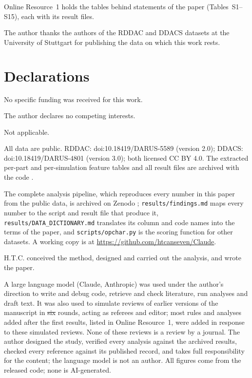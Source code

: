 \documentclass[pdflatex,sn-basic,lineno]{sn-jnl}
\providecommand{\DIFadd}[1]{{\protect\color{blue}\uwave{#1}}} %
\providecommand{\DIFdel}[1]{{\protect\color{red}\sout{#1}}}                      %
\providecommand{\DIFaddbegin}{} %
\providecommand{\DIFaddend}{} %
\providecommand{\DIFdelbegin}{} %
\providecommand{\DIFdelend}{} %
\newcommand{\DIFscaledelfig}{0.5}
\newlength{\DIFdelgraphicswidth} %
\newlength{\DIFdelgraphicsheight} %
\newcommand{\DIFaddincludegraphics}[2][]{{\color{blue}\fbox{\DIFOincludegraphics[#1]{#2}}}} %
\newcommand{\DIFdelincludegraphics}[2][]{%
\sbox{\DIFdelgraphicsbox}{\DIFOincludegraphics[#1]{#2}}%
\settoboxwidth{\DIFdelgraphicswidth}{\DIFdelgraphicsbox} %
\settoboxtotalheight{\DIFdelgraphicsheight}{\DIFdelgraphicsbox} %
\scalebox{\DIFscaledelfig}{%
\parbox[b]{\DIFdelgraphicswidth}{\usebox{\DIFdelgraphicsbox}\\[-\baselineskip] \rule{\DIFdelgraphicswidth}{0em}}\llap{\resizebox{\DIFdelgraphicswidth}{\DIFdelgraphicsheight}{%
\setlength{\unitlength}{\DIFdelgraphicswidth}%
\begin{picture}(1,1)%
\thicklines\linethickness{2pt} %
{\color[rgb]{1,0,0}\put(0,0){\framebox(1,1){}}}%
{\color[rgb]{1,0,0}\put(0,0){\line( 1,1){1}}}%
{\color[rgb]{1,0,0}\put(0,1){\line(1,-1){1}}}%
\end{picture}%
}\hspace*{3pt}}} %
} %
\DeclareRobustCommand{\DIFaddbegin}{\DIFOaddbegin \let\includegraphics\DIFaddincludegraphics} %
\DeclareRobustCommand{\DIFaddend}{\DIFOaddend \let\includegraphics\DIFOincludegraphics} %
\DeclareRobustCommand{\DIFdelbegin}{\DIFOdelbegin \let\includegraphics\DIFdelincludegraphics} %
\DeclareRobustCommand{\DIFdelend}{\DIFOaddend \let\includegraphics\DIFOincludegraphics} %
\begin{document}
\backmatter

Online Resource~1 holds the tables behind statements of the paper (Tables~S1--S15), each with its result files.

The author thanks the authors of the RDDAC and DDACS datasets at the University of Stuttgart for publishing the data on which this work rests.

\section*{Declarations}

No specific funding was received for this work.

The author declares no competing interests.

Not applicable.

All data are public. RDDAC: doi:10.18419/DARUS-5589 (version 2.0); DDACS: doi:10.18419/DARUS-4801 (version 3.0); both licensed CC BY 4.0. The extracted per-part and per-simulation feature tables and all result files are archived with the code \citep{canseven2026archive}.

The complete analysis pipeline, which reproduces every number in this paper from the public data, is archived on Zenodo \citep{canseven2026archive}; \texttt{results/findings.md} maps every number to the script and result file that produce it, \texttt{results/DATA\_DICTIONARY.md} translates its column and code names into the terms of the paper, and \texttt{scripts/opchar.py} is the scoring function for other datasets. A working copy is at \url{https://github.com/htcanseven/Claude}.

H.T.C. conceived the method, designed and carried out the analysis, and wrote the paper.

A large language model (Claude, Anthropic) was used under the author's direction to write and debug code, retrieve and check literature, run analyses and draft text. It was also used to simulate reviews of earlier versions of the manuscript in \DIFdelbegin \DIFdel{six }\DIFdelend \DIFaddbegin \DIFadd{seven }\DIFaddend rounds, acting as referees and editor; most rules and analyses added after the first results, listed in Online Resource~1, were added in response to these simulated reviews. None of these reviews is a review by a journal. The author designed the study, verified every analysis against the archived results, checked every reference against its published record, and takes full responsibility for the content; the language model is not an author. All figures come from the released code; none is AI-generated.


\FloatBarrier
{\small
}
\end{document}

